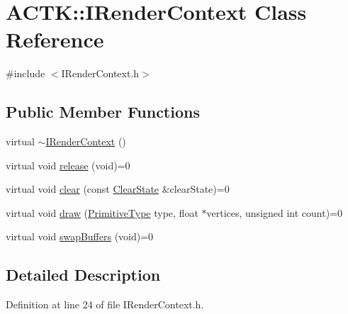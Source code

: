 \hypertarget{class_a_c_t_k_1_1_i_render_context}{\section{A\-C\-T\-K\-:\-:I\-Render\-Context Class Reference}
\label{class_a_c_t_k_1_1_i_render_context}
}


{\ttfamily \#include $<$I\-Render\-Context.\-h$>$}

\subsection*{Public Member Functions}
\begin{DoxyCompactItemize}
\item 
virtual \hyperlink{class_a_c_t_k_1_1_i_render_context_a12b89502fd6c6a34cb85b89f76e3db72}{$\sim$\-I\-Render\-Context} ()
\item 
virtual void \hyperlink{class_a_c_t_k_1_1_i_render_context_a0475659ee84785828a8fc892b5dc7f47}{release} (void)=0
\item 
virtual void \hyperlink{class_a_c_t_k_1_1_i_render_context_a41f531e95e5a51f5a73ae9f502ea37ee}{clear} (const \hyperlink{struct_a_c_t_k_1_1_clear_state}{Clear\-State} \&clear\-State)=0
\item 
virtual void \hyperlink{class_a_c_t_k_1_1_i_render_context_a9bb4ac05498d7a9610b7264ca45dea99}{draw} (\hyperlink{namespace_a_c_t_k_ac879d5bd28581fddd1c876d2103156b8}{Primitive\-Type} type, float $\ast$vertices, unsigned int count)=0
\item 
virtual void \hyperlink{class_a_c_t_k_1_1_i_render_context_a54c06790c64d628be8d6c164c375e4fb}{swap\-Buffers} (void)=0
\end{DoxyCompactItemize}


\subsection{Detailed Description}


Definition at line 24 of file I\-Render\-Context.\-h.



